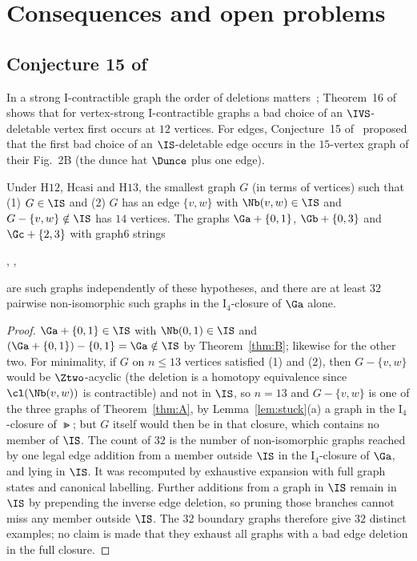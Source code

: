 \section{Consequences and open problems}\label{sec:consequences}

\subsection{\texorpdfstring{Conjecture 15 of~\cite{DEFH2023}}{Conjecture 15 of Dochtermann et al. (2023)}}

In a strong I-contractible graph the order of deletions matters~\cite[Fig.~2B]{DEFH2023}; Theorem~16 of~\cite{DEFH2023} shows that for vertex-strong I-contractible graphs a bad choice of an $\IVS$-deletable vertex first occurs at $12$ vertices. For edges, Conjecture~15 of~\cite{DEFH2023} proposed that the first bad choice of an $\IS$-deletable edge occurs in the $15$-vertex graph of their Fig.~2B (the dunce hat $\Dunce$ plus one edge).

\begin{theorem}\label{thm:D}
Under $\mathrm{H12}$, $\mathrm{Hcasi}$ and $\mathrm{H13}$, the smallest graph $G$ (in terms of vertices) such that (1) $G\in\IS$ and (2) $G$ has an edge $\{v,w\}$ with $\Nb(v,w)\in\IS$ and $G-\{v,w\}\notin\IS$ has $14$ vertices. The graphs $\Ga+\{0,1\}$, $\Gb+\{0,3\}$ and $\Gc+\{2,3\}$ with graph6 strings
\begin{center}\small
{},\quad
\gsix{MCB@thku?\textasciitilde{}Lylk\}[?},\\
\end{center} are such graphs independently of these hypotheses, and there are at least $32$ pairwise non-isomorphic such graphs in the $\mathrm{I}_4$-closure of $\Ga$ alone.
\end{theorem}
\begin{proof}
$\Ga+\{0,1\}\in\IS$ with $\Nb(0,1)\in\IS$ and $(\Ga+\{0,1\})-\{0,1\}=\Ga\notin\IS$ by Theorem~\ref{thm:B}; likewise for the other two. For minimality, if $G$ on $n\le 13$ vertices satisfied (1) and (2), then $G-\{v,w\}$ would be $\Ztwo$-acyclic (the deletion is a homotopy equivalence since $\cl(\Nb(v,w))$ is contractible) and not in $\IS$, so $n=13$ and $G-\{v,w\}$ is one of the three graphs of Theorem~\ref{thm:A}, by Lemma~\ref{lem:stuck}(a) a graph in the $\mathrm{I}_4$-closure of $\Gt$; but $G$ itself would then be in that closure, which contains no member of $\IS$. The count of $32$ is the number of non-isomorphic graphs reached by one legal edge addition from a member outside $\IS$ in the $\mathrm{I}_4$-closure of $\Ga$, and lying in $\IS$. It was recomputed by exhaustive expansion with full graph states and canonical labelling. Further additions from a graph in $\IS$ remain in $\IS$ by prepending the inverse edge deletion, so pruning those branches cannot miss any member outside $\IS$. The $32$ boundary graphs therefore give $32$ distinct examples; no claim is made that they exhaust all graphs with a bad edge deletion in the full closure.
\end{proof}

